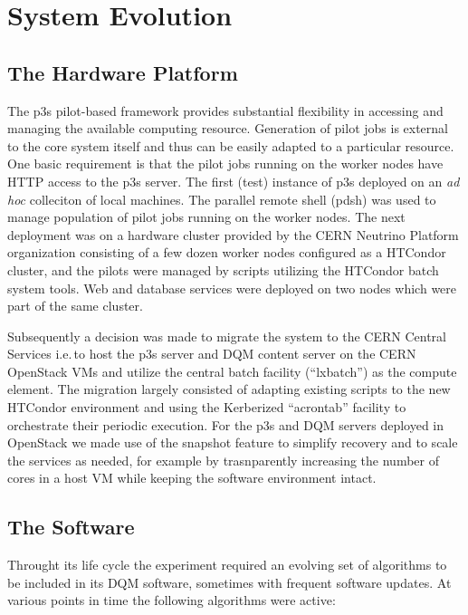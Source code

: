 \documentclass{webofc}
\begin{document}
\section{System Evolution}

\subsection{The Hardware Platform}
\label{sec:hardware}

The p3s pilot-based framework provides substantial flexibility in accessing and
managing the available computing resource. Generation of pilot jobs is external
to the core system itself and thus can be easily adapted to a particular resource.
One basic requirement is that the pilot jobs running on the worker nodes have
HTTP access to the p3s server. The first (test) instance of p3s deployed
on an \textit{ad hoc} colleciton of local machines. The parallel remote shell
(pdsh) was used to manage population of pilot jobs running on the worker nodes.
The next deployment was on a hardware cluster provided by the CERN
Neutrino Platform organization \cite{platform} consisting of a few dozen
worker nodes configured as a HTCondor cluster, and the pilots were managed
by scripts utilizing the HTCondor batch system tools. Web and database
services were deployed on two nodes which were part of the same cluster.

Subsequently a decision was made to migrate the system to the CERN Central
Services i.e.\,to host the p3s server and DQM content server on the CERN OpenStack
VMs and utilize  the central batch facility (``lxbatch'') as the compute element.
The migration largely consisted of adapting existing scripts to the new HTCondor
environment and using the Kerberized ``acrontab'' facility to orchestrate their
periodic execution. For the p3s and DQM servers deployed in OpenStack we made
use of the snapshot feature to simplify recovery and to scale the services as
needed, for example by trasnparently increasing the number of cores in a host
VM while keeping the software environment intact.

\subsection{The Software}
\label{sec:software}

Throught its life cycle the experiment required an evolving set of algorithms to
be included in its DQM software, sometimes with frequent software updates.
At various points in time the following algorithms were active:
\end{document}
